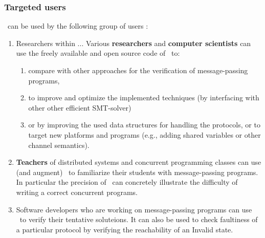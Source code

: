 \subsubsection{Targeted users}
%
\MPass\ can be used by the following group of users :
%
\begin{enumerate}
%
\item Researchers within ... 
Various \textbf{researchers} and \textbf{computer scientists} can use the freely available and open source code of \MPass\ to:
\begin{enumerate}
\item compare with other approaches for the verification of message-passing programs,
\item to improve and optimize the implemented techniques (by interfacing with other  other efficient SMT-solver)
\item or by improving the used data structures for handling the protocols, or to target new platforms and programs (e.g., adding shared variables or  other channel semantics).
\end{enumerate}  
%  
\item \textbf{Teachers} of distributed  systems  and concurrent programming classes can use (and augment) \MPass\ 
  to familiarize their students with message-passing programs.  In particular the precision of \MPass\ can concretely illustrate the difficulty of writing a correct concurrent programs.
%  
\item Software developers who are working on message-passing programs can use \MPass\   to verify their tentative soluteions.
  It can also be used to check faultiness of a particular protocol by verifying the reachability of an Invalid state.
\end{enumerate}